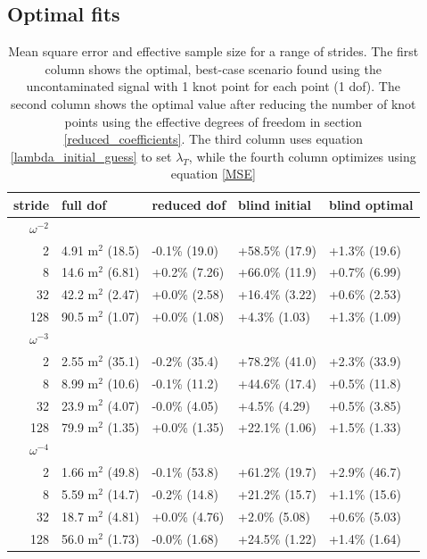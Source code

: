 \documentclass[10pt,journal]{IEEEtran}
\begin{document}
\subsection{Optimal fits} \label{optimal_fits}

\begin{table}[ht]
\caption{Mean square error and effective sample size for a range of strides. The first column shows the optimal, best-case scenario found using the uncontaminated signal with 1 knot point for each point (1 dof). The second column shows the optimal value after reducing the number of knot points using the effective degrees of freedom in section \ref{reduced_coefficients}. The third column uses equation \ref{lambda_initial_guess} to set $\lambda_T$, while the fourth column optimizes using equation \ref{MSE} }
\label{fit_results_gaussian}
\centering
\begin{tabular}{r | llll} stride & full dof & reduced dof & blind initial & blind optimal \\ \hline \hline 
$\omega^{-2}$ &&&&  \\ \hline 
2 & 4.91 m$^2$ (18.5) &  -0.1\% (19.0) &  +58.5\% (17.9) &  +1.3\% (19.6) \\ 
8 & 14.6 m$^2$ (6.81) &  +0.2\% (7.26) &  +66.0\% (11.9) &  +0.7\% (6.99) \\ 
32 & 42.2 m$^2$ (2.47) &  +0.0\% (2.58) &  +16.4\% (3.22) &  +0.6\% (2.53) \\ 
128 & 90.5 m$^2$ (1.07) &  +0.0\% (1.08) &  +4.3\% (1.03) &  +1.3\% (1.09) \\ 
$\omega^{-3}$ &&&&  \\ \hline 
2 & 2.55 m$^2$ (35.1) &  -0.2\% (35.4) &  +78.2\% (41.0) &  +2.3\% (33.9) \\ 
8 & 8.99 m$^2$ (10.6) &  -0.1\% (11.2) &  +44.6\% (17.4) &  +0.5\% (11.8) \\ 
32 & 23.9 m$^2$ (4.07) &  -0.0\% (4.05) &  +4.5\% (4.29) &  +0.5\% (3.85) \\ 
128 & 79.9 m$^2$ (1.35) &  +0.0\% (1.35) &  +22.1\% (1.06) &  +1.5\% (1.33) \\ 
$\omega^{-4}$ &&&&  \\ \hline 
2 & 1.66 m$^2$ (49.8) &  -0.1\% (53.8) &  +61.2\% (19.7) &  +2.9\% (46.7) \\ 
8 & 5.59 m$^2$ (14.7) &  -0.2\% (14.8) &  +21.2\% (15.7) &  +1.1\% (15.6) \\ 
32 & 18.7 m$^2$ (4.81) &  +0.0\% (4.76) &  +2.0\% (5.08) &  +0.6\% (5.03) \\ 
128 & 56.0 m$^2$ (1.73) &  -0.0\% (1.68) &  +24.5\% (1.22) &  +1.4\% (1.64) \\ 
\end{tabular} 

\end{table}
\end{document}
